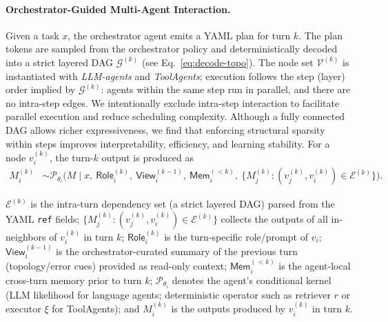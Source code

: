 \documentclass{article}
\theoremstyle{definition}
\begin{document}
\paragraph{Orchestrator-Guided Multi-Agent Interaction.}
Given a task $x$, the orchestrator agent emits a YAML plan for turn $k$. The plan tokens are sampled from the orchestrator policy and deterministically decoded into a strict layered DAG $\mathcal{G}^{(k)}$ (see Eq.~\ref{eq:decode-topo}). The node set $\mathcal{V}^{(k)}$ is instantiated with \emph{LLM-agents} and \emph{ToolAgents}; execution follows the step (layer) order implied by $\mathcal{G}^{(k)}$: agents within the same step run in parallel, and there are no intra-step edges. We intentionally exclude intra-step interaction to facilitate parallel execution and reduce scheduling complexity. Although a fully connected DAG allows richer expressiveness, we find that enforcing structural sparsity within steps improves interpretability, efficiency, and learning stability. For a node $v_i^{(k)}$, the turn-$k$ output is produced as
\begin{equation}
\begin{aligned}
M_i^{(k)} &\sim \mathcal{P}_{\theta_i}\!\big(M \mid x,\ \textsf{Role}_i^{(k)},\ \textsf{View}_i^{(k-1)},\ \textsf{Mem}_i^{(<k)},\ \{M_j^{(k)}:(v_j^{(k)},v_i^{(k)})\in\mathcal{E}^{(k)}\}\big).
\end{aligned}
\end{equation}

$\mathcal{E}^{(k)}$ is the intra-turn dependency set (a strict layered DAG) parsed from the YAML \texttt{ref} fields; $\{M_j^{(k)}:(v_j^{(k)},v_i^{(k)})\in\mathcal{E}^{(k)}\}$ collects the outputs of all in-neighbors of $v_i^{(k)}$ in turn $k$; $\textsf{Role}_i^{(k)}$ is the turn-specific role/prompt of $v_i$; $\textsf{View}_i^{(k-1)}$ is the orchestrator-curated summary of the previous turn (topology/error cues) provided as read-only context; $\textsf{Mem}_i^{(<k)}$ is the agent-local cross-turn memory prior to turn $k$; $\mathcal{P}_{\theta_i}$ denotes the agent’s conditional kernel (LLM likelihood for language agents; deterministic operator such as retriever $r$ or executor $\xi$ for ToolAgents); and $M_i^{(k)}$ is the outputs produced by $v_i^{(k)}$ in turn $k$. 
\end{document}
